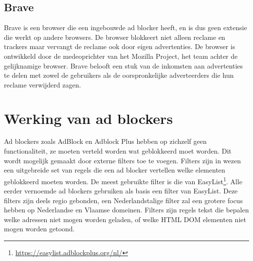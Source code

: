 \documentclass[pdftex,a4paper,12pt,twoside]{report}
\begin{document}
\subsection{Brave}
\label{sec:Brave}
Brave is een browser die een ingebouwde ad blocker heeft, en is dus geen extensie die werkt op andere browsers. De browser blokkeert niet alleen reclame en trackers maar vervangt de reclame ook door eigen advertenties. De browser is ontwikkeld door de medeoprichter van het Mozilla Project, het team achter de gelijknamige browser. Brave belooft een stuk van de inkomsten aan advertenties te delen met zowel de gebruikers als de oorspronkelijke adverteerders die hun reclame verwijderd zagen.

\section{Werking van ad blockers}
\label{ch:Werking van ad blockers}
Ad blockers zoals AdBlock en Adblock Plus hebben op zichzelf geen functionaliteit, ze moeten verteld worden wat geblokkeerd moet worden. Dit wordt mogelijk gemaakt door externe filters toe te voegen. Filters zijn in wezen een uitgebreide set van regels die een ad blocker vertellen welke elementen geblokkeerd moeten worden. De meest gebruikte filter is die van EasyList\footnote{\url{https://easylist.adblockplus.org/nl/}}. Alle eerder vernoemde ad blockers gebruiken als basis een filter van EasyList. Deze filters zijn deels regio gebonden, een Nederlandstalige filter zal een grotere focus hebben op Nederlandse en Vlaamse domeinen. Filters zijn regels tekst die bepalen welke adressen niet mogen worden geladen, of welke HTML DOM elementen niet mogen worden getoond.
\end{document}
